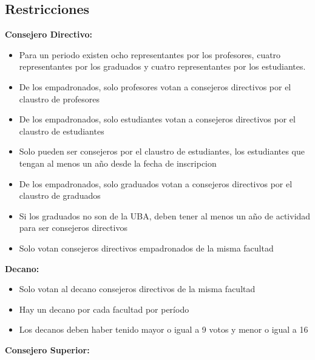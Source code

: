 \documentclass[a4paper, 10pt, twoside]{article}
\begin{document}
\subsection{Restricciones}

\textbf{Consejero Directivo:}

\begin{itemize}
\item Para un periodo existen ocho representantes por los profesores, cuatro representantes por los graduados y cuatro representantes por los estudiantes.
\item De los empadronados, solo profesores votan a consejeros directivos por el claustro de profesores
\item De los empadronados, solo estudiantes votan a consejeros directivos por el claustro de estudiantes
\item Solo pueden ser consejeros por el claustro de estudiantes, los estudiantes que tengan al menos un año desde la fecha de inscripcion
\item De los empadronados, solo graduados votan a consejeros directivos por el claustro de graduados
\item Si los graduados no son de la UBA, deben tener al menos un año de actividad para ser consejeros directivos
\item Solo votan consejeros directivos empadronados de la misma facultad
\end{itemize}

\textbf{Decano:}

\begin{itemize}
\item Solo votan al decano consejeros directivos de la misma facultad
\item Hay un decano por cada facultad por período
\item Los decanos deben haber tenido mayor o igual a 9 votos y menor o igual a 16
\end{itemize}

\textbf{Consejero Superior:}
\end{document}
